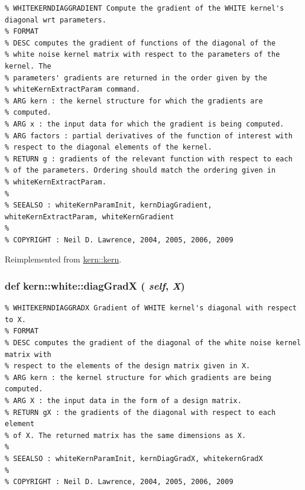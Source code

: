 \footnotesize\begin{verbatim}% WHITEKERNDIAGGRADIENT Compute the gradient of the WHITE kernel's diagonal wrt parameters.
% FORMAT
% DESC computes the gradient of functions of the diagonal of the
% white noise kernel matrix with respect to the parameters of the kernel. The
% parameters' gradients are returned in the order given by the
% whiteKernExtractParam command.
% ARG kern : the kernel structure for which the gradients are
% computed.
% ARG x : the input data for which the gradient is being computed.
% ARG factors : partial derivatives of the function of interest with
% respect to the diagonal elements of the kernel.
% RETURN g : gradients of the relevant function with respect to each
% of the parameters. Ordering should match the ordering given in
% whiteKernExtractParam.
%
% SEEALSO : whiteKernParamInit, kernDiagGradient, whiteKernExtractParam, whiteKernGradient
%
% COPYRIGHT : Neil D. Lawrence, 2004, 2005, 2006, 2009

\end{verbatim}
\normalsize
 

Reimplemented from \hyperlink{classkern_1_1kern}{kern::kern}.\hypertarget{classkern_1_1white_1a7249a7d74e3282f581a4ac80be35ce}{
\subsubsection[{diagGradX}]{\setlength{\rightskip}{0pt plus 5cm}def kern::white::diagGradX ( {\em self}, \/   {\em X})}}
\label{classkern_1_1white_1a7249a7d74e3282f581a4ac80be35ce}




\footnotesize\begin{verbatim}% WHITEKERNDIAGGRADX Gradient of WHITE kernel's diagonal with respect to X.
% FORMAT
% DESC computes the gradient of the diagonal of the white noise kernel matrix with
% respect to the elements of the design matrix given in X.
% ARG kern : the kernel structure for which gradients are being computed.
% ARG X : the input data in the form of a design matrix.
% RETURN gX : the gradients of the diagonal with respect to each element
% of X. The returned matrix has the same dimensions as X.
%
% SEEALSO : whiteKernParamInit, kernDiagGradX, whitekernGradX
%
% COPYRIGHT : Neil D. Lawrence, 2004, 2005, 2006, 2009

\end{verbatim}
\normalsize
 

